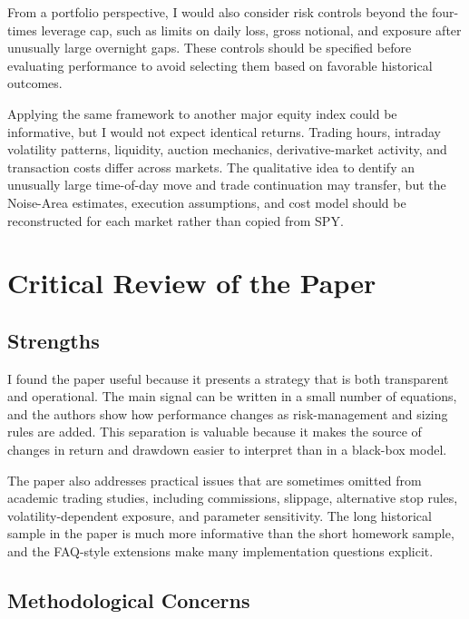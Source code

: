 \documentclass{article}
\begin{document}
From a portfolio perspective, I would also consider risk controls beyond the four-times leverage cap, such as limits on daily loss, gross notional, and exposure after unusually large overnight gaps. These controls should be specified before evaluating performance to avoid selecting them based on favorable historical outcomes.

Applying the same framework to another major equity index could be informative, but I would not expect identical returns. Trading hours, intraday volatility patterns, liquidity, auction mechanics, derivative-market activity, and transaction costs differ across markets. The qualitative idea to dentify an unusually large time-of-day move and trade continuation may transfer, but the Noise-Area estimates, execution assumptions, and cost model should be reconstructed for each market rather than copied from SPY.

\section{Critical Review of the Paper}
\label{sec:review}

\subsection{Strengths}

I found the paper useful because it presents a strategy that is both transparent and operational. The main signal can be written in a small number of equations, and the authors show how performance changes as risk-management and sizing rules are added. This separation is valuable because it makes the source of changes in return and drawdown easier to interpret than in a black-box model.

The paper also addresses practical issues that are sometimes omitted from academic trading studies, including commissions, slippage, alternative stop rules, volatility-dependent exposure, and parameter sensitivity. The long historical sample in the paper is much more informative than the short homework sample, and the FAQ-style extensions make many implementation questions explicit.

\subsection{Methodological Concerns}
\end{document}
